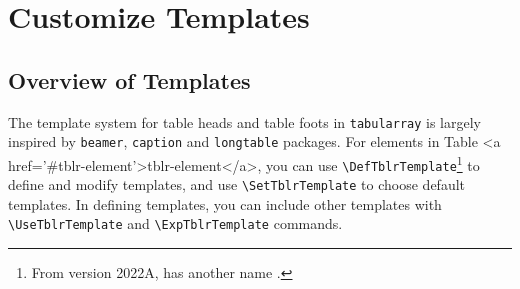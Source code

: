 \documentclass[oneside]{book}
\begin{document}
\section{Customize Templates}

\subsection{Overview of Templates}

The template system for table heads and table foots in \verb!tabularray! is largely inspired
by \verb!beamer!, \verb!caption! and \verb!longtable! packages. For elements in Table <a href='#tblr-element'>tblr-element</a>,
you can use \verb!\DefTblrTemplate!\footnote{From version 2022A,
\texttt{\string\DefTblrTemplate} has another name \texttt{\string\DeclareTblrTemplate}.}
to define and modify templates,
and use \verb!\SetTblrTemplate! to choose default templates. In defining templates,
you can include other templates with \verb!\UseTblrTemplate! and \verb!\ExpTblrTemplate! commands.
\end{document}
